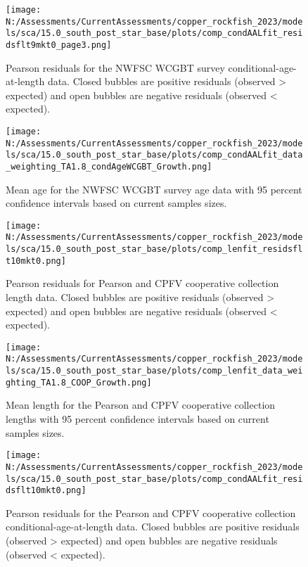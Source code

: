 \documentclass[11pt,
  english,
  letterpaper,
]{article}
\begin{document}
\begin{figure}
\centering
\texttt{[image: N:/Assessments/CurrentAssessments/copper\_rockfish\_2023/models/sca/15.0\_south\_post\_star\_base/plots/comp\_condAALfit\_residsflt9mkt0\_page3.png]}
\caption{Pearson residuals for the NWFSC WCGBT survey conditional-age-at-length data. Closed bubbles are positive residuals (observed \textgreater{} expected) and open bubbles are negative residuals (observed \textless{} expected).\label{fig:wcgbt-age-pearson-3}}
\end{figure}

\pagebreak

\begin{figure}
\centering
\texttt{[image: N:/Assessments/CurrentAssessments/copper\_rockfish\_2023/models/sca/15.0\_south\_post\_star\_base/plots/comp\_condAALfit\_data\_weighting\_TA1.8\_condAgeWCGBT\_Growth.png]}
\caption{Mean age for the NWFSC WCGBT survey age data with 95 percent confidence intervals based on current samples sizes.\label{fig:wcgbt-mean-age-fit}}
\end{figure}

\pagebreak

\begin{figure}
\centering
\texttt{[image: N:/Assessments/CurrentAssessments/copper\_rockfish\_2023/models/sca/15.0\_south\_post\_star\_base/plots/comp\_lenfit\_residsflt10mkt0.png]}
\caption{Pearson residuals for Pearson and CPFV cooperative collection length data. Closed bubbles are positive residuals (observed \textgreater{} expected) and open bubbles are negative residuals (observed \textless{} expected).\label{fig:coop-len-pearson}}
\end{figure}

\pagebreak

\begin{figure}
\centering
\texttt{[image: N:/Assessments/CurrentAssessments/copper\_rockfish\_2023/models/sca/15.0\_south\_post\_star\_base/plots/comp\_lenfit\_data\_weighting\_TA1.8\_COOP\_Growth.png]}
\caption{Mean length for the Pearson and CPFV cooperative collection lengths with 95 percent confidence intervals based on current samples sizes.\label{fig:coop-mean-len-fit}}
\end{figure}

\pagebreak

\begin{figure}
\centering
\texttt{[image: N:/Assessments/CurrentAssessments/copper\_rockfish\_2023/models/sca/15.0\_south\_post\_star\_base/plots/comp\_condAALfit\_residsflt10mkt0.png]}
\caption{Pearson residuals for the Pearson and CPFV cooperative collection conditional-age-at-length data. Closed bubbles are positive residuals (observed \textgreater{} expected) and open bubbles are negative residuals (observed \textless{} expected).\label{fig:coop-age-pearson}}
\end{figure}
\end{document}
